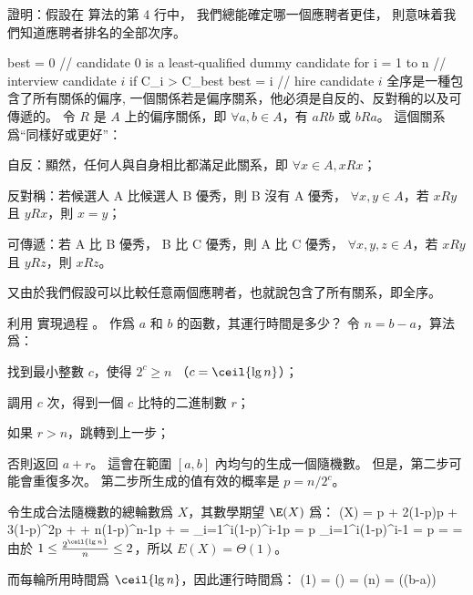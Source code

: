 \startsection[
  title={The hiring problem},
]

\startEXERCISE
證明：假設在  算法的第 4 行中，
我們總能確定哪一個應聘者更佳，
則意味着我們知道應聘者排名的全部次序。

\startCLRSCODE
best = 0	// candidate 0 is a least-qualified dummy candidate
for i = 1 to n
	// interview candidate $i$
	if C_i > C_{best}
		best = i
		// hire candidate $i$
\stopCLRSCODE
\stopEXERCISE
\startANSWER
全序是一種包含了所有關係的偏序,
一個關係若是偏序關系，他必須是自反的、反對稱的以及可傳遞的。
令 $R$ 是 $A$ 上的偏序關係，即 $\forall a,b \in A$，有 $a R b$ 或 $b R a$。
這個關系爲“同樣好或更好”：
\startigBase[1]
\item 自反：顯然，任何人與自身相比都滿足此關系，即 $\forall x\in A, x R x$；
\item 反對稱：若候選人 A 比候選人 B 優秀，則 B 沒有 A 優秀， $\forall x,y\in A$，若 $xRy$ 且 $yRx$，則 $x=y$；
\item 可傳遞：若 A 比 B 優秀， B 比 C 優秀，則 A 比 C 優秀， $\forall x,y,z\in A$，若 $xRy$ 且 $yRz$，則 $xRz$。
\stopigBase

又由於我們假設可以比較任意兩個應聘者，也就說包含了所有關系，即全序。
\stopANSWER

\startEXERCISE \DIFFICULT
利用  實現過程 。
作爲 $a$ 和 $b$ 的函數，其運行時間是多少？
\stopEXERCISE
\startANSWER
令 $n=b-a$，算法爲：
\startigBase[n]
\item 找到最小整數 $c$，使得 $2^c\ge n$ （$c=\ceil{\lg{n}}$）；
\item 調用  $c$ 次，得到一個 $c$ 比特的二進制數 $r$；
\item 如果 $r>n$，跳轉到上一步；
\item 否則返回 $a+r$。
\stopigBase
這會在範圍 $[a, b]$ 內均勻的生成一個隨機數。
但是，第二步可能會重復多次。
第二步所生成的值有效的概率是 $p=n/2^c$。

令生成合法隨機數的總輪數爲 $X$，其數學期望 $\E(X)$ 爲：
\startsplitformula\startmathalignment
\NC \E(X)
    \NC = p + 2(1-p)p + 3(1-p)^2p + \cdots + n(1-p)^{n-1}p + \cdots \NR
\NC \NC = \sum_{i=1}^{\infty}i(1-p)^{i-1}p \NR
\NC \NC = p \sum_{i=1}^{\infty}i(1-p)^{i-1} \NR
\NC \NC = p  \NR
\NC \NC =  \NR
\NC \NC =  \NR
\stopmathalignment\stopsplitformula
由於 $1 \le \frac{2^{\ceil{\lg n}}}{n} \le 2$，所以 $E(X)=\Theta(1)$。

而每輪所用時間爲 $\ceil{\lg n}$，因此運行時間爲：
\startformula
{}\Theta(1) = \Theta() = \Theta(\lg n) = \Theta(\lg(b-a))
\stopformula
\stopANSWER

